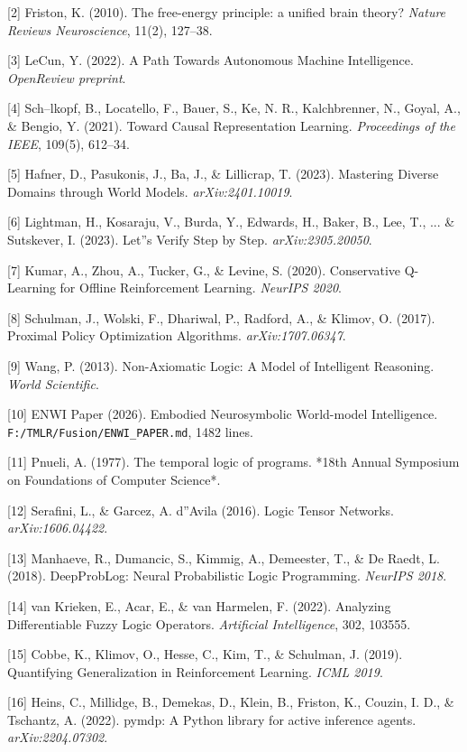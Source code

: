 \documentclass[11pt]{article}
\begin{document}
[2] Friston, K. (2010). The free-energy principle: a unified brain theory?
    \textit{Nature Reviews Neuroscience}, 11(2), 127--38.

[3] LeCun, Y. (2022). A Path Towards Autonomous Machine Intelligence.
    \textit{OpenReview preprint}.

[4] Sch--lkopf, B., Locatello, F., Bauer, S., Ke, N. R., Kalchbrenner, N.,
    Goyal, A., \& Bengio, Y. (2021). Toward Causal Representation Learning.
    \textit{Proceedings of the IEEE}, 109(5), 612--34.

[5] Hafner, D., Pasukonis, J., Ba, J., \& Lillicrap, T. (2023). Mastering
    Diverse Domains through World Models. \textit{arXiv:2401.10019}.

[6] Lightman, H., Kosaraju, V., Burda, Y., Edwards, H., Baker, B., Lee, T., ... \&
    Sutskever, I. (2023). Let''s Verify Step by Step. \textit{arXiv:2305.20050}.

[7] Kumar, A., Zhou, A., Tucker, G., \& Levine, S. (2020). Conservative Q-Learning
    for Offline Reinforcement Learning. \textit{NeurIPS 2020}.

[8] Schulman, J., Wolski, F., Dhariwal, P., Radford, A., \& Klimov, O. (2017).
    Proximal Policy Optimization Algorithms. \textit{arXiv:1707.06347}.

[9] Wang, P. (2013). Non-Axiomatic Logic: A Model of Intelligent Reasoning.
    \textit{World Scientific}.

[10] ENWI Paper (2026). Embodied Neurosymbolic World-model Intelligence.
    \texttt{F:/TMLR/Fusion/ENWI\_PAPER.md}, 1482 lines.

[11] Pnueli, A. (1977). The temporal logic of programs. *18th Annual Symposium
    on Foundations of Computer Science*.

[12] Serafini, L., \& Garcez, A. d''Avila (2016). Logic Tensor Networks.
    \textit{arXiv:1606.04422}.

[13] Manhaeve, R., Dumancic, S., Kimmig, A., Demeester, T., \& De Raedt, L.
    (2018). DeepProbLog: Neural Probabilistic Logic Programming. \textit{NeurIPS 2018}.

[14] van Krieken, E., Acar, E., \& van Harmelen, F. (2022). Analyzing
    Differentiable Fuzzy Logic Operators. \textit{Artificial Intelligence}, 302,
    103555.

[15] Cobbe, K., Klimov, O., Hesse, C., Kim, T., \& Schulman, J. (2019).
    Quantifying Generalization in Reinforcement Learning. \textit{ICML 2019}.

[16] Heins, C., Millidge, B., Demekas, D., Klein, B., Friston, K., Couzin, I. D.,
    \& Tschantz, A. (2022). pymdp: A Python library for active inference
    agents. \textit{arXiv:2204.07302}.
\end{document}
